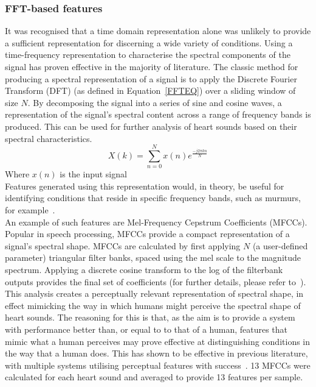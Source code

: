 \documentclass[titlepage, 12pt]{scrartcl} \usepackage{enumitem}
\begin{document}
\subsubsection{FFT-based features}\label{FFT}
It was recognised that a time domain representation alone was unlikely to
provide a sufficient representation for discerning a wide variety of
conditions. Using a time-frequency representation to characterise the spectral
components of the signal has proven effective in the majority of literature.
The classic method for producing a spectral representation of a signal is to
apply the Discrete Fourier Transform (DFT) (as defined in Equation~\ref{FFTEQ})
over a sliding window of size $N$. By decomposing the signal into a series of
sine and cosine waves, a representation of the signal's spectral content across
a range of frequency bands is produced. This can be used for further analysis
of heart sounds based on their spectral characteristics.
\begin{equation}\label{FFTEQ}
X(k)=\sum\limits_{n=0}^{N}x(n)e^{\frac{-j2\pi kn}{N}}
\end{equation}
Where $x(n)$ is the input signal\\
Features generated using this representation would, in theory, be useful for
identifying conditions that reside in specific frequency bands, such as
murmurs, for example~\parencite{Sepehri2010}.\\

An example of such features are Mel-Frequency Cepstrum Coefficients (MFCCs).
Popular in speech processing, MFCCs provide a compact representation of a
signal's spectral shape. MFCCs are calculated by first applying $N$ (a
user-defined parameter) triangular filter banks, spaced using the mel scale to
the magnitude spectrum. Applying a discrete cosine transform to the log of the
filterbank outputs provides the final set of coefficients (for further details,
please refer to~\parencite{Lerch2012}). This analysis
creates a perceptually relevant representation of spectral shape, in effect
mimicking the way in which humans might perceive the spectral shape of heart
sounds. The reasoning for this is that, as the aim is to provide a system with
performance better than, or equal to to that of a human, features that mimic
what a human perceives may prove effective at distinguishing conditions in the
way that a human does. This has shown to be effective in previous literature,
with multiple systems utilising perceptual features with
success~\parencite{Ortiz2016, Rubin2016, Quiceno-Manrique2010a}. 13 MFCCs were
calculated for each heart sound and averaged to provide 13 features
per sample.\\
\end{document}
